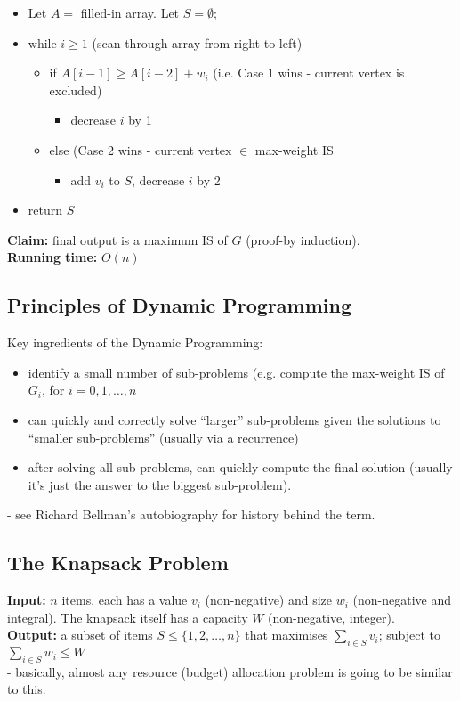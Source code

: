 \documentclass{scrartcl}
\begin{document}
\begin{itemize}
\item Let $A = $ filled-in array. Let $S = \emptyset$;
\item while $i \geq 1$ (scan through array from right to left)
  \begin{itemize}
  \item if $A[i-1] \geq A[i-2] +w_i$ (i.e. Case 1 wins - current vertex is
    excluded)
    \begin{itemize}
    \item decrease $i$ by 1
    \end{itemize}
  \item else (Case 2 wins - current vertex $\in$ max-weight IS
    \begin{itemize}
    \item add $v_i$ to $S$, decrease $i$ by 2
    \end{itemize}
  \end{itemize}
\item return $S$
\end{itemize}
{\bf Claim: } final output is a maximum IS of $G$ (proof-by induction).\\
{\bf Running time: } $O(n)$

\subsection{Principles of Dynamic Programming}
\label{sec:8-5}
Key ingredients of the Dynamic Programming:
\begin{itemize}
\item identify a small number of sub-problems (e.g. compute the max-weight IS of
  $G_i$, for $i=0, 1, \dots, n$
\item can quickly and correctly solve ``larger'' sub-problems given the
  solutions to ``smaller sub-problems'' (usually via a recurrence)
\item after solving all sub-problems, can quickly compute the final solution
  (usually it's just the answer to the biggest sub-problem).
\end{itemize}
- see Richard Bellman's autobiography for history behind the term.

\subsection{The Knapsack Problem}
\label{sec:9-1} {\bf Input: } $n$ items, each has a value $v_i$ (non-negative)
and size $w_i$ (non-negative and integral). The knapsack itself has a capacity
$W$
(non-negative, integer).\\
{\bf Output: } a subset of items $S \leq \{1, 2, \dots, n\}$ that maximises
$\sum \limits_{i \in S} v_i$; subject to $\sum \limits_{i \in S} w_i \leq W$\\
- basically, almost any resource (budget) allocation problem is going to be
similar to this.
\end{document}
